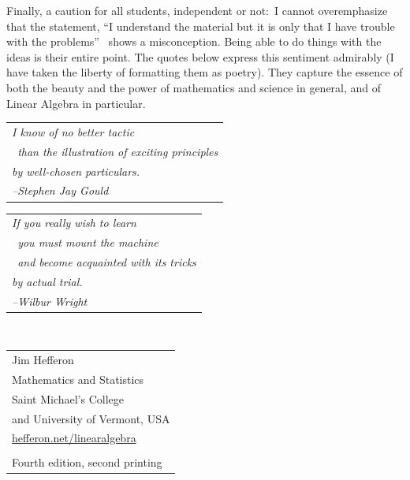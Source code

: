 {Finally, a caution for all students, independent or not:~I 
cannot overemphasize that the 
statement, ``I understand the material but it is only 
that I have trouble with the problems''\ %
shows a misconception.
Being able to do things with the ideas is their entire point.
The quotes below express this sentiment admirably
(I have taken the liberty of formatting them as poetry).
They capture the essence of both the beauty and the power
of mathematics and science in general, 
and of Linear Algebra in particular.

\medskip
\par\noindent\begin{tabular}[t]{@{}l@{}}
  \textit{I know of no better tactic}                     \\
  \textit{\ than the illustration of exciting principles} \\
  \textit{by well-chosen particulars.}                    \\
  \hspace*{1in}\textit{--Stephen Jay Gould}
\end{tabular}

\medskip
\par\noindent
\begin{tabular}[t]{@{}l@{}}   
\textit{If you really wish to learn}                     \\
   \textit{\ you must mount the machine}  \\ 
   \textit{\ and become acquainted with its tricks} \\
   \textit{by actual trial.}                    \\
   \hspace*{1in}\textit{--Wilbur Wright}
\end{tabular}


\vspace*{3ex}
\par\ \hfill\begin{tabular}[t]{@{}l@{}}
                       Jim Hef{}feron            \\
                       Mathematics and Statistics \\ 
                       Saint Michael's College \\ 
                       and University of Vermont, USA  \\     
                       \url{hefferon.net/linearalgebra} \\
                         \\
                       Fourth edition, second printing
                    \end{tabular}

}
